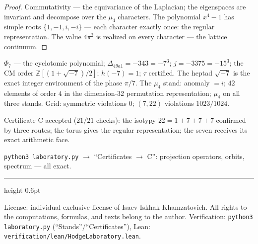 \documentclass[11pt,a4paper]{article}
\theoremstyle{plain}
\theoremstyle{definition}
\theoremstyle{remark}
\newcommand{\ZZ}{\mathbb{Z}}
\begin{document}
\begin{proof}
Commutativity --- the equivariance of the Laplacian; the eigenspaces
are invariant and decompose over the $\mu_4$ characters. The
polynomial $x^4-1$ has simple roots $\{1,-1,i,-i\}$ --- each
character exactly once: the regular representation. The value
$4\pi^2$ is realized on every character --- the lattice continuum.
\end{proof}

\begin{databox}
$\Phi_7$ --- the cyclotomic polynomial; $\Delta_{49a1}=-343=-7^3$;
$j=-3375=-15^3$; the CM order $\ZZ[(1+\sqrt{-7})/2]$; $h(-7)=1$;
$\tau$ certified. The heptad $\sqrt{-7}$ is the exact integer
environment of the phase $\pi/7$. The $\mu_4$ stand: anomaly $=i$;
$42$ elements of order $4$ in the dimension-32 permutation
representation; $\mu_4$ on all three stands. Grid: symmetric
violations $0$; $(7,22)$ violations $1023/1024$.
\end{databox}

\begin{statusbox}[summary]
Certificate C accepted ($21/21$ checks): the isotypy
$22=1+7+7+7$ confirmed by three routes; the torus gives the regular
representation; the seven receives its exact arithmetic face.
\end{statusbox}

\begin{verifybox}[reproduction]
\texttt{python3 laboratory.py} $\to$ ``Certificates $\to$ C'':
projection operators, orbits, spectrum --- all exact.
\end{verifybox}

\vfill
{\color{linkblue}\hrule height 0.6pt}
\vspace{0.5em}
{\small\color{gray}
License: individual exclusive license of Isaev Iskhak Khamzatovich.
All rights to the computations, formulas, and texts belong to the author.
Verification: \texttt{python3 laboratory.py} (``Stands''/``Certificates''),
Lean: \texttt{verification/lean/HodgeLaboratory.lean}.
}
\end{document}
